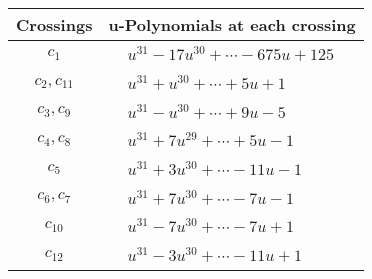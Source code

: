 \documentclass[1p]{elsarticle_modified}
\theoremstyle{definition}
\begin{document}
\begin{tabular}{m{50pt}|m{274pt}}
Crossings & \hspace{64pt}u-Polynomials at each crossing \\
\hline $$\begin{aligned}c_{1}\end{aligned}$$&$\begin{aligned}
&u^{31}-17 u^{30}+\cdots-675 u+125
\end{aligned}$\\
\hline $$\begin{aligned}c_{2},c_{11}\end{aligned}$$&$\begin{aligned}
&u^{31}+u^{30}+\cdots+5 u+1
\end{aligned}$\\
\hline $$\begin{aligned}c_{3},c_{9}\end{aligned}$$&$\begin{aligned}
&u^{31}- u^{30}+\cdots+9 u-5
\end{aligned}$\\
\hline $$\begin{aligned}c_{4},c_{8}\end{aligned}$$&$\begin{aligned}
&u^{31}+7 u^{29}+\cdots+5 u-1
\end{aligned}$\\
\hline $$\begin{aligned}c_{5}\end{aligned}$$&$\begin{aligned}
&u^{31}+3 u^{30}+\cdots-11 u-1
\end{aligned}$\\
\hline $$\begin{aligned}c_{6},c_{7}\end{aligned}$$&$\begin{aligned}
&u^{31}+7 u^{30}+\cdots-7 u-1
\end{aligned}$\\
\hline $$\begin{aligned}c_{10}\end{aligned}$$&$\begin{aligned}
&u^{31}-7 u^{30}+\cdots-7 u+1
\end{aligned}$\\
\hline $$\begin{aligned}c_{12}\end{aligned}$$&$\begin{aligned}
&u^{31}-3 u^{30}+\cdots-11 u+1
\end{aligned}$\\
\hline
\end{tabular}\\~\\
\end{document}
